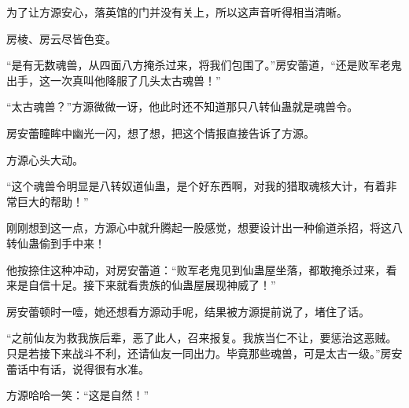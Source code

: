 \begin{this_body}
为了让方源安心，落英馆的门并没有关上，所以这声音听得相当清晰。

房棱、房云尽皆色变。

“是有无数魂兽，从四面八方掩杀过来，将我们包围了。”房安蕾道，“还是败军老鬼出手，这一次真叫他降服了几头太古魂兽！”

“太古魂兽？”方源微微一讶，他此时还不知道那只八转仙蛊就是魂兽令。

房安蕾瞳眸中幽光一闪，想了想，把这个情报直接告诉了方源。

方源心头大动。

“这个魂兽令明显是八转奴道仙蛊，是个好东西啊，对我的猎取魂核大计，有着非常巨大的帮助！”

刚刚想到这一点，方源心中就升腾起一股感觉，想要设计出一种偷道杀招，将这八转仙蛊偷到手中来！

他按捺住这种冲动，对房安蕾道：“败军老鬼见到仙蛊屋坐落，都敢掩杀过来，看来是自信十足。接下来就看贵族的仙蛊屋展现神威了！”

房安蕾顿时一噎，她还想看方源动手呢，结果被方源提前说了，堵住了话。

“之前仙友为救我族后辈，恶了此人，召来报复。我族当仁不让，要惩治这恶贼。只是若接下来战斗不利，还请仙友一同出力。毕竟那些魂兽，可是太古一级。”房安蕾话中有话，说得很有水准。

方源哈哈一笑：“这是自然！”

\end{this_body}

